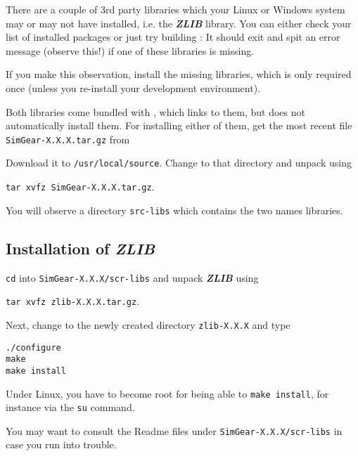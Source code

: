 There are a couple of 3rd party libraries which your Linux or Windows system may or may not have installed, i.e. the \textbf{\textit{ZLIB}} library. You can either check your list of installed packages or just try building \SimGear{}: It should exit and spit an error message (observe this!) if one of these libraries is missing.

If you make this observation, install the missing libraries, which is only required once (unless you re-install your development environment). 

Both libraries come bundled with \SimGear{}, which links to them, but does not automatically install them. For installing either of them, get the most recent file \texttt{SimGear-X.X.X.tar.gz} from
  \medskip

   \medskip

 \noindent
Download it to \texttt{/usr/local/source}. Change to that directory and unpack \SimGear{}
using

        \texttt{tar xvfz SimGear-X.X.X.tar.gz}.

You will observe a directory \texttt{src-libs} which contains the two names libraries. 

\subsection{Installation of \textbf{\textit{ZLIB}\label{zlibinstall}}}

\noindent
 \texttt{cd} into \texttt{SimGear-X.X.X/scr-libs} and unpack \textbf{\textit{ZLIB}} using
 \medskip
 
 \noindent
 				\texttt{tar xvfz zlib-X.X.X.tar.gz}.
 	\medskip

\noindent 				
 Next, change to the newly created directory \texttt{zlib-X.X.X} and type
 \medskip

 \noindent
        \texttt{./configure}\\
        \texttt{make}\\
        \texttt{make install}
 \medskip

 \noindent
 Under Linux, you have to become root for being able to \texttt{make install}, for instance via the \texttt{su} command. 
 
  You may want to consult the Readme files under \texttt{SimGear-X.X.X/scr-libs} in case you run into trouble.

